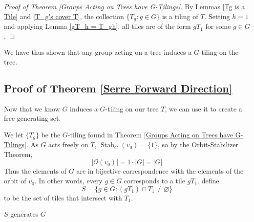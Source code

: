 \begin{proof}[Proof of Theorem \ref{Groups Acting on Trees have G-Tilings}]
    By Lemmas \ref{Tg is a Tile} and \ref{T_g's cover T}, the collection $\{T_g: g \in G\}$ is a tiling of $T$. Setting $h = 1$ and applying Lemma \ref{gT_h = T_gh}, all tiles are of the form $gT_1$ for some $g \in G$.
\end{proof}

We have thus shown that any group acting on a tree induces a $G$-tiling on the tree.

\subsection{Proof of Theorem \ref{Serre Forward Direction}}

Now that we know $G$ induces a $G$-tiling on our tree $T$, we can use it to create a free generating set. 

We let $\{T_g\}$ be the $G$-tiling found in Theorem \ref{Groups Acting on Trees have G-Tilings}. As $G$ acts freely on $T$, $\operatorname{Stab}_G(v_0) = \{1\}$, so by the Orbit-Stabilizer Theorem,
\[|\mathcal{O}(v_0)| = 1 \cdot |G| = |G|\]
Thus the elements of $G$ are in bijective correspondence with the elements of the orbit of $v_0$. In other words, every $g \in G$ corresponds to a tile $gT_1$. define 
\[
S = \{g \in G : (gT_1) \cap T_1 \neq \varnothing\}
\]
to be the set of tiles that intersect with $T_1$.

\begin{lemma}\label{S Generates G}
    $S$ generates $G$
\end{lemma}

